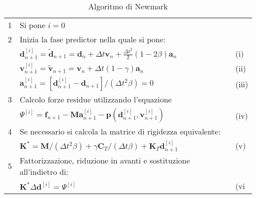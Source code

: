 \begin{table}[ht]
\caption{Algoritmo di Newmark}	
\begin{tabular}{lll}
	\toprule
	1 & Si pone $i=0 $                                                                                                                                                            &        \\
	2 & Inizia la fase predictor nella quale si pone:                                                                                                                             &        \\
	  & $ \boldsymbol{d}_{n+1}^{[i]} = \boldsymbol{\tilde{d}}_{n+1} = \boldsymbol{d}_n + \varDelta t \boldsymbol{v}_n + \frac{\varDelta t^2 }{2} (1 - 2 \beta) \boldsymbol{a}_n$  & (i)    \\
	  & $ \boldsymbol{v}_{n+1}^{[i]} = \boldsymbol{\tilde{v}}_{n+1} = \boldsymbol{v}_n + \varDelta t(1 - \gamma) \boldsymbol{a}_n $                                               & (ii)   \\
	  & $ \boldsymbol{a}_{n+1}^{[i]} = [\boldsymbol{d}_{n+1}^{[i]} -\boldsymbol{d}_{n+1} ] / ( \varDelta t ^2 \beta) = 0 $                                                        & (iii)  \\
	3 & Calcolo forze residue utilizzando l'equazione                                                                                                                             &        \\
	  & $\boldsymbol{\varPsi}^{[i]} = \boldsymbol{f}_{n+1} - \boldsymbol{M a}_{n+1}^{[i]} - \boldsymbol{p}(\boldsymbol{d}_{n+1}^{[i]}, \boldsymbol{v}_{n+1}^{[i]})$               & (iv)   \\
	4 & Se necessario si calcola la matrice di rigidezza equivalente:                                                                                                             &        \\
	  & $\boldsymbol{K}^* = \boldsymbol{M}/(\varDelta t^2 \beta) + \gamma \boldsymbol{C}_T/(\varDelta t \beta) + \boldsymbol{K}_T \boldsymbol{d}_{n+1}^{[i]}$                     & (v)    \\
	5 & Fattorizzazione, riduzione in avanti e sostituzione all'indietro di:                                                                                                      &        \\
	  & $\boldsymbol{K}^* \varDelta \boldsymbol{d}^{[i]} = \boldsymbol{\varPsi}^{[i]}$                                                                                            & (vi    \\

\end{tabular}
\end{table}
